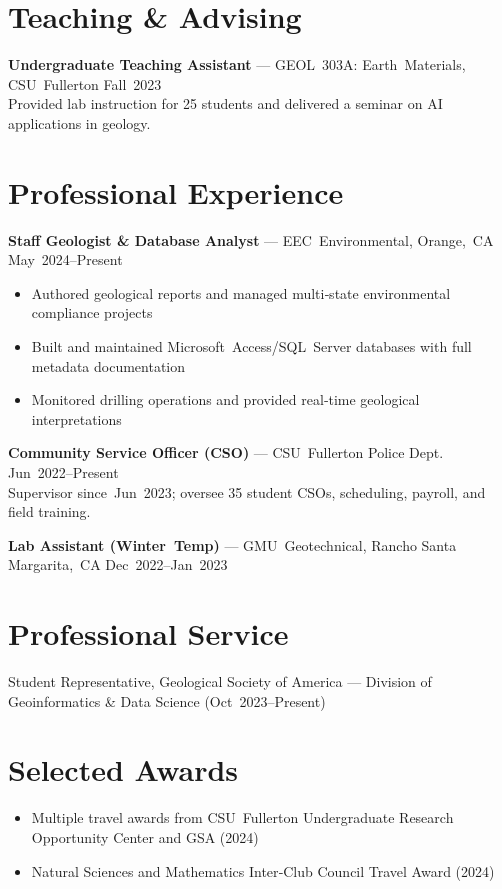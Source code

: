 \documentclass[10pt]{res}
\begin{document}
\section{Teaching \& Advising}
\textbf{Undergraduate Teaching Assistant} — GEOL 303A: Earth Materials, CSU Fullerton \hfill Fall 2023\\
Provided lab instruction for 25 students and delivered a seminar on AI applications in geology.

\section{Professional Experience}
\textbf{Staff Geologist \& Database Analyst} — EEC Environmental, Orange, CA \hfill May 2024–Present
\begin{itemize}[leftmargin=*, noitemsep]
  \item Authored geological reports and managed multi‑state environmental compliance projects
  \item Built and maintained Microsoft Access/SQL Server databases with full metadata documentation
  \item Monitored drilling operations and provided real‑time geological interpretations
\end{itemize}

\textbf{Community Service Officer (CSO)} — CSU Fullerton Police Dept. \hfill Jun 2022–Present\\
Supervisor since Jun 2023; oversee 35 student CSOs, scheduling, payroll, and field training.

\textbf{Lab Assistant (Winter Temp)} — GMU Geotechnical, Rancho Santa Margarita, CA \hfill Dec 2022–Jan 2023

\section{Professional Service}
Student Representative, Geological Society of America — Division of Geoinformatics \& Data Science (Oct 2023–Present)

\section{Selected Awards}
\begin{itemize}[noitemsep]
  \item Multiple travel awards from CSU Fullerton Undergraduate Research Opportunity Center and GSA (2024)
  \item Natural Sciences and Mathematics Inter‑Club Council Travel Award (2024)
\end{itemize}
\end{document}
